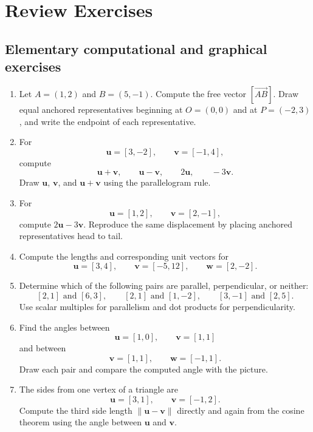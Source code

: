 \section{Review Exercises}

\subsection{Elementary computational and graphical exercises}

\begin{enumerate}

\item Let $A=(1,2)$ and $B=(5,-1)$. Compute the free vector
$[\overrightarrow{AB}]$. Draw equal anchored representatives beginning at
$O=(0,0)$ and at $P=(-2,3)$, and write the endpoint of each representative.

\item For
\[
\mathbf u=[3,-2],\qquad \mathbf v=[-1,4],
\]
compute
\[
\mathbf u+\mathbf v,\qquad
\mathbf u-\mathbf v,\qquad
2\mathbf u,\qquad
-3\mathbf v.
\]
Draw $\mathbf u$, $\mathbf v$, and $\mathbf u+\mathbf v$ using the
parallelogram rule.

\item For
\[
\mathbf u=[1,2],\qquad \mathbf v=[2,-1],
\]
compute $2\mathbf u-3\mathbf v$. Reproduce the same displacement by placing
anchored representatives head to tail.

\item Compute the lengths and corresponding unit vectors for
\[
\mathbf u=[3,4],\qquad
\mathbf v=[-5,12],\qquad
\mathbf w=[2,-2].
\]

\item Determine which of the following pairs are parallel, perpendicular, or
neither:
\[
[2,1]\text{ and }[6,3],\qquad
[2,1]\text{ and }[1,-2],\qquad
[3,-1]\text{ and }[2,5].
\]
Use scalar multiples for parallelism and dot products for perpendicularity.

\item Find the angles between
\[
\mathbf u=[1,0],\qquad \mathbf v=[1,1]
\]
and between
\[
\mathbf v=[1,1],\qquad \mathbf w=[-1,1].
\]
Draw each pair and compare the computed angle with the picture.

\item The sides from one vertex of a triangle are
\[
\mathbf u=[3,1],\qquad \mathbf v=[-1,2].
\]
Compute the third side length $\|\mathbf u-\mathbf v\|$ directly and again
from the cosine theorem using the angle between $\mathbf u$ and $\mathbf v$.


\end{enumerate}
